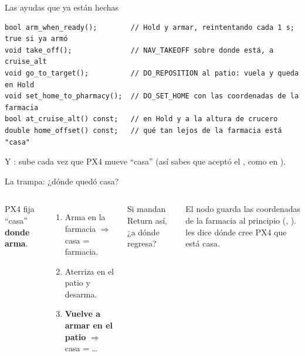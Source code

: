 \begin{frame}[fragile]{Las ayudas que ya están hechas}
  \begin{lstlisting}[style=cpp,caption={entrega\_domicilio: tu trabajo es decidir CUÁNDO llamar cada una}]
bool arm_when_ready();        // Hold y armar, reintentando cada 1 s; true si ya armó
void take_off();              // NAV_TAKEOFF sobre donde está, a cruise_alt
void go_to_target();          // DO_REPOSITION al patio: vuela y queda en Hold
void set_home_to_pharmacy();  // DO_SET_HOME con las coordenadas de la farmacia
bool at_cruise_alt() const;   // en Hold y a la altura de crucero
double home_offset() const;   // qué tan lejos de la farmacia está "casa"
  \end{lstlisting}
  \small Y : sube cada vez que PX4 mueve ``casa''
  (así sabes que aceptó el , como en ).
\end{frame}

\begin{frame}{La trampa: ¿dónde quedó casa?}
  \begin{columns}[c]
    \small
    PX4 fija ``casa'' \textbf{donde arma}.
    \begin{enumerate}
      \item Arma en la farmacia $\Rightarrow$ casa = farmacia.
      \item Aterriza en el patio y desarma.
      \item \textbf{Vuelve a armar en el patio} $\Rightarrow$ casa = \ldots
    \end{enumerate}
    Si mandan Return así, ¿a dónde regresa?
    \vspace{0.3em}
    \begin{idea}
      \small El nodo guarda las coordenadas de la farmacia al principio
      (, ).  les dice dónde cree PX4
      que está casa.
    \end{idea}
  \end{columns}
\end{frame}

